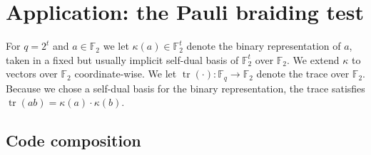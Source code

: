 \documentclass[11pt]{article}
\theoremstyle{definition}
\newtheorem{definition}[theorem]{Definition}
\newcommand{\code}{\mathcal{C}}
\newcommand{\field}{\mathbb{F}_2}
\newcommand{\N}{\ensuremath{\mathbb{N}}}
\newcommand{\F}{\ensuremath{\mathbb{F}}}
\newcommand{\eps}{\varepsilon}
\DeclareMathOperator{\tr}{tr}
\begin{document}
\section{Application: the Pauli braiding test}


For $q=2^t$ and $a\in \field$ we let $\kappa(a)\in\F_2^t$ denote the binary representation of $a$, taken in a fixed but usually implicit self-dual basis of $\F_2^t$ over $\F_2$. We extend $\kappa$ to vectors over $\field$ coordinate-wise. We let $\tr(\cdot):\F_q\to\F_2$ denote the trace over $\F_2$. Because we chose a self-dual basis for the binary representation, the trace satisfies $\tr(ab)=\kappa(a)\cdot\kappa(b)$. 
	


%
%
%

\subsection{Code composition}
\label{sec:code-comp}
\end{document}
